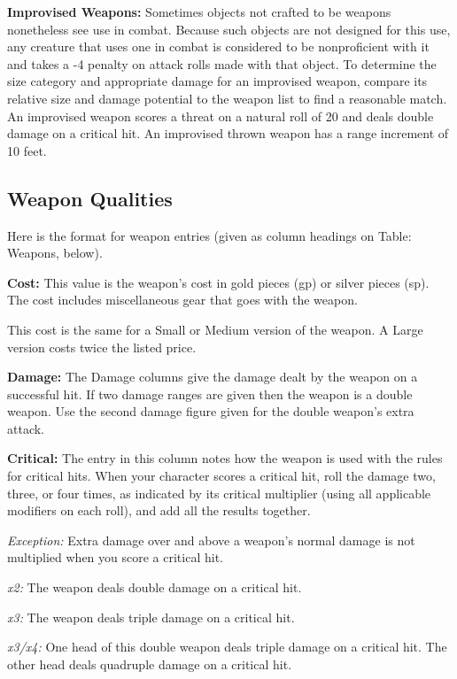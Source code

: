 \vspace{12pt}
\textbf{Improvised Weapons:} Sometimes objects not crafted to be weapons nonetheless see use in combat. Because such objects are not designed for this use, any creature that uses one in combat is considered to be nonproficient with it and takes a -4 penalty on attack rolls made with that object. To determine the size category and appropriate damage for an improvised weapon, compare its relative size and damage potential to the weapon list to find a reasonable match. An improvised weapon scores a threat on a natural roll of 20 and deals double damage on a critical hit. An improvised thrown weapon has a range increment of 10 feet.

\subsection{Weapon Qualities}

Here is the format for weapon entries (given as column headings on Table: Weapons, below).

\textbf{Cost:} This value is the weapon's cost in gold pieces (gp) or silver pieces (sp). The cost includes miscellaneous gear that goes with the weapon.

This cost is the same for a Small or Medium version of the weapon. A Large version costs twice the listed price.

\textbf{Damage:} The Damage columns give the damage dealt by the weapon on a successful hit. If two damage ranges are given then the weapon is a double weapon. Use the second damage figure given for the double weapon's extra attack.

\vspace{12pt}
\textbf{Critical:} The entry in this column notes how the weapon is used with the rules for critical hits. When your character scores a critical hit, roll the damage two, three, or four times, as indicated by its critical multiplier (using all applicable modifiers on each roll), and add all the results together.

\textit{Exception:} Extra damage over and above a weapon's normal damage is not multiplied when you score a critical hit.

\textit{x2:} The weapon deals double damage on a critical hit.

\textit{x3:} The weapon deals triple damage on a critical hit.

\textit{x3/x4:} One head of this double weapon deals triple damage on a critical hit. The other head deals quadruple damage on a critical hit.

